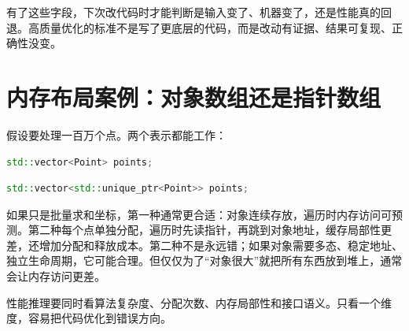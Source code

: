 有了这些字段，下次改代码时才能判断是输入变了、机器变了，还是性能真的回退。高质量优化的标准不是写了更底层的代码，而是改动有证据、结果可复现、正确性没变。

\section{内存布局案例：对象数组还是指针数组}

假设要处理一百万个点。两个表示都能工作：

\begin{lstlisting}[language=C++,caption={连续对象数组}]
std::vector<Point> points;
\end{lstlisting}

\begin{lstlisting}[language=C++,caption={指针数组}]
std::vector<std::unique_ptr<Point>> points;
\end{lstlisting}

如果只是批量求和坐标，第一种通常更合适：对象连续存放，遍历时内存访问可预测。第二种每个点单独分配，遍历时先读指针，再跳到对象地址，缓存局部性更差，还增加分配和释放成本。第二种不是永远错；如果对象需要多态、稳定地址、独立生命周期，它可能合理。但仅仅为了“对象很大”就把所有东西放到堆上，通常会让内存访问更差。

\begin{keyidea}
性能推理要同时看算法复杂度、分配次数、内存局部性和接口语义。只看一个维度，容易把代码优化到错误方向。
\end{keyidea}
